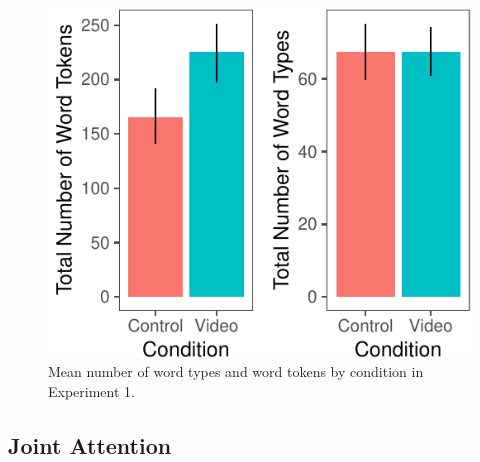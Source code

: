 \documentclass[10pt, letterpaper]{article}
\newenvironment{CodeChunk}{}{}
\begin{document}
\begin{CodeChunk}
\begin{figure}[H]

{\centering \includegraphics{figs/e1token_type-1} 

}

\caption[Mean number of word types and word tokens by condition in Experiment 1]{Mean number of word types and word tokens by condition in Experiment 1.}\label{fig:e1token_type}
\end{figure}
\end{CodeChunk}

\subsection{Joint Attention}\label{joint-attention}
\end{document}
